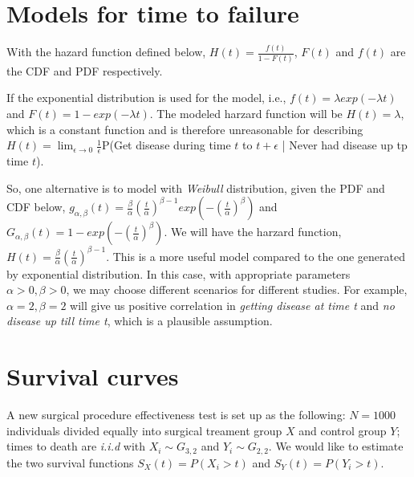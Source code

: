 \documentclass{article}\usepackage{graphicx, color}
\begin{document}
\section*{Models for time to failure}

\hspace{12 pt} With the hazard function defined below, \newline
$\displaystyle H(t) = \frac{f(t)}{1-F(t)}$, \newline
$F(t)$ and $f(t)$ are the CDF and PDF respectively. 

\vspace{6 pt}
If the exponential distribution is used for the model, i.e., \newline
$f(t) = \lambda exp(-\lambda t)$ and $F(t) = 1 - exp(-\lambda t)$.\newline
The modeled harzard function will be \newline
$H(t) = \lambda$, \newline
which is a constant function and is therefore unreasonable for
describing \newline
$H(t) = \lim_{\epsilon \to 0} \frac{1}{\epsilon}$P(Get disease during
time $t$ to $t+\epsilon$ | Never had disease up tp time $t$).

\vspace{6 pt}
So, one alternative is to model with \textit{Weibull} distribution,
given the PDF and CDF below,\newline
$\displaystyle g_{\alpha ,\beta}(t)=\frac{\beta}{\alpha}(\frac{t}{\alpha})^{\beta-1}exp(-(\frac{t}{\alpha})^{\beta})$ and
$\displaystyle G_{\alpha ,\beta}(t)=1 - exp(-(\frac{t}{\alpha})^{\beta})$. \newline
We will have the harzard function, \newline
$\displaystyle H(t)=\frac{\beta}{\alpha}(\frac{t}{\alpha})^{\beta-1}$. \newline
This is a more useful model compared to the one generated by
exponential distribution. In this case, with appropriate parameters
$\alpha > 0, \beta > 0$, we may choose different scenarios for
different studies. For example, $\alpha=2, \beta=2$ will give us
positive correlation in \textit{getting disease at time t} and
\textit{no disease up till time t}, which is a plausible assumption.



\newpage
\section*{Survival curves}
\hspace{12 pt} A new surgical procedure effectiveness test is set up
as the following: \newline
$N = 1000$ individuals divided equally into
surgical treament group $X$ and control group $Y$; \newline
times to death are \textit{i.i.d} with $X_i \sim G_{3,2}$ and $Y_i\sim G_{2,2}$. \newline  
We would like to estimate the two survival functions
$S_X(t) = P(X_i > t)$ and $S_Y(t) = P(Y_i > t)$.
\end{document}
